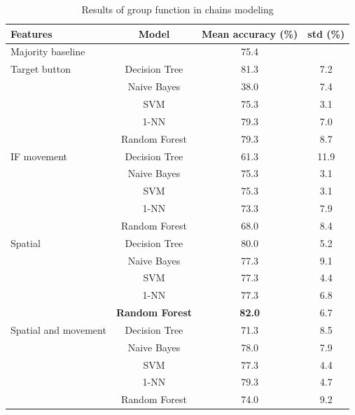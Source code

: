 \begin{table}[!htbp]
 \centering
\begin{tabular}{lccc}
\toprule
Features & Model    & Mean accuracy (\%) & std (\%) \\
\midrule
Majority baseline &   & 75.4	& \\
\midrule
Target button 	& Decision Tree 	& 81.3		& 7.2 	\\
				& Naive Bayes  	& 38.0		& 7.4	\\
				& SVM 			& 75.3		& 3.1 	\\
				& 1-NN			& 79.3		& 7.0 	\\
				& Random Forest	& 79.3		& 8.7	\\
\midrule
IF movement	& Decision Tree 	& 	61.3	& 11.9 \\
			& Naive Bayes  	&	75.3	& 3.1	\\
			& SVM 			&	75.3	& 3.1 	\\
			& 1-NN			&	73.3	 & 7.9 	\\
			& Random Forest	&	68.0	& 8.4 	\\
\midrule
Spatial	 	& Decision Tree 	& 80.0	& 5.2 \\
			& Naive Bayes  	& 77.3 	& 9.1	\\
			& SVM 			& 77.3	& 4.4 	\\
			& 1-NN			& 77.3	& 6.8 \\
			& \textbf{Random Forest}	& \textbf{82.0}	& 6.7 \\	

\midrule
Spatial and movement& Decision Tree 	& 71.3	& 8.5 \\
					& Naive Bayes  	& 78.0	& 7.9	\\
					& SVM 			& 77.3	& 4.4 	\\
					& 1-NN			& 79.3	& 4.7 \\
					& Random Forest	& 74.0	& 9.2 \\	 	
\bottomrule
\end{tabular}
\caption{Results of group function in chains modeling}
\label{tab:chains-ml-group}
\end{table}

